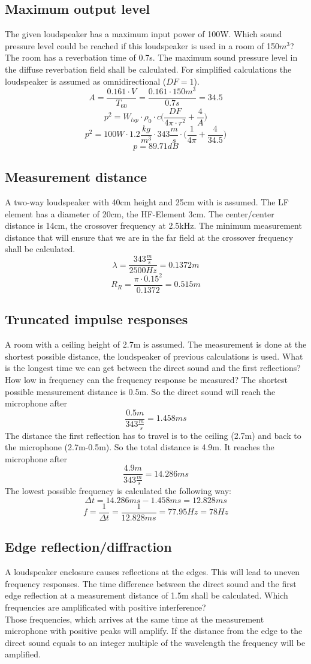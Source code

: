 \documentclass{article}
\begin{document}
\subsection{Maximum output level}
The given loudspeaker has a maximum input power of 100W. Which sound pressure level could be reached if this loudspeaker is used in a room of 150$m^3$? The room has a reverbation time of 0.7s. The maximum sound pressure level in the diffuse reverbation field shall be calculated. For simplified calculations the loudspeaker is assumed as omnidirectional ($DF=1$).\\
$$A=\frac{0.161\cdot V}{T_{60}}=\frac{0.161\cdot 150m^3}{0.7s}=34.5$$
$$p^2=W_{lsp}\cdot\rho_0\cdot c\bigg(\frac{DF}{4\pi\cdot r^2}+\frac{4}{A}\bigg)$$
$$p^2=100W\cdot 1.2\frac{kg}{m^3}\cdot 343\frac{m}{s}\cdot\bigg(\frac{1}{4\pi}+\frac{4}{34.5}\bigg)$$
$$p=89.71dB$$
\subsection{Measurement distance}
A two-way loudspeaker with 40cm height and 25cm with is assumed. The LF element has a diameter of 20cm, the HF-Element 3cm. The center/center distance is 14cm, the crossover frequency at 2.5kHz. The minimum measurement distance that will ensure that we are in the far field at the crossover frequency shall be calculated.
$$\lambda=\frac{343\frac{m}{s}}{2500Hz}=0.1372m$$
$$R_R=\frac{\pi\cdot 0.15^2}{0.1372}=0.515m$$
\subsection{Truncated impulse responses}
A room with a ceiling height of 2.7m is assumed. The measurement is done at the shortest possible distance, the loudspeaker of previous calculations is used. What is the longest time we can get between the direct sound and the first reflections? How low in frequency can the frequency response be measured?
The shortest possible measurement distance is 0.5m. So the direct sound will reach the microphone after
$$\frac{0.5m}{343\frac{m}{s}}=1.458ms$$
The distance the first reflection has to travel is to the ceiling (2.7m) and back to the microphone (2.7m-0.5m). So the total distance is 4.9m. It reaches the microphone after
$$\frac{4.9m}{343\frac{m}{s}}=14.286ms$$
The lowest possible frequency is calculated the following way:
$$\Delta t=14.286ms-1.458ms=12.828ms$$
$$f=\frac{1}{\Delta t}=\frac{1}{12.828ms}=77.95Hz=78Hz$$
\subsection{Edge reflection/diffraction}
A loudspeaker enclosure causes reflections at the edges. This will lead to uneven frequency responses. The time difference between the direct sound and the first edge reflection at a measurement distance of 1.5m shall be calculated. Which frequencies are amplificated with positive interference?\\
Those frequencies, which arrives at the same time at the measurement microphone with positive peaks will amplify. If the distance from the edge to the direct sound equals to an integer multiple of the wavelength the frequency will be amplified.
\end{document}
